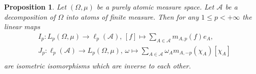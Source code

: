 \documentclass[12pt]{article}
\newtheorem{proposition}[theorem]{Proposition}
\begin{document}
\begin{proposition}\label{LpOnPurAtomMeasSpRepr}
    Let $(\Omega,\mu)$ be a purely atomic measure space. Let $\mathcal{A}$ be a 
    decomposition of $\Omega$ into atoms of finite measure. Then for 
    any $1\leq p<+\infty$ the linear maps
    \[
    \begin{aligned}
        &I_p:
        L_p(\Omega,\mu)\to \ell_p(\mathcal{A}),\,
        [f]\mapsto\sum_{A\in\mathcal{A}} m_{A,p}(f) e_A, \\
        &J_p:
        \ell_p(\mathcal{A})\to L_p(\Omega,\mu),\,
        \omega\mapsto\sum_{A\in\mathcal{A}} \omega_A m_{A,-p}(\chi_A) [\chi_A]\\
    \end{aligned}
    \]
    are isometric isomorphisms which are inverse to each other.
\end{proposition}
\end{document}

